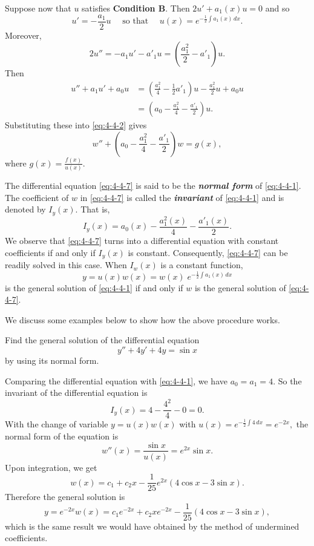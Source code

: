 Suppose now that \(u\) satisfies \textbf{Condition B}. Then \(2u'+a_1(x)u=0\) and so
\[ u' = -\frac{a_1}{2}u\quad \text{ so that }\quad  u(x) = e^{-\frac{1}{2}\int a_1(x) \,dx}.\]
 Moreover, 
 \begin{equation}\label{eq:4-4-6}
 	2u''= - a_1 u' - a'_1 u =\left(\frac{a_1^2}{2}-a'_1\right)u.
\end{equation}
Then 
\[\begin{split}
	u''+a_1 u'+a_0 u &=\left(\frac{a_1^2}{4}-\frac{1}{2}a'_1\right)u - \frac{a_1^2}{2}u +a_0u\\
	&=\left(a_0-\frac{a_1^2}{4}-\frac{a'_1}{2}\right)u.
\end{split} \]
Substituting these into \eqref{eq:4-4-2} gives
\begin{equation}\label{eq:4-4-7}
w''+\left(a_0-\frac{a_1^2}{4}-\frac{a'_1}{2}\right)w = g(x), 
\end{equation}
where \(g(x) = \frac{f(x)}{u(x)}.\)

The differential equation \eqref{eq:4-4-7} is said to be the \textbf{\textit{normal form}} of \eqref{eq:4-4-1}.
The coefficient of \(w\) in \eqref{eq:4-4-7} is called the \textbf{\textit{invariant}} of \eqref{eq:4-4-1} and is denoted by \(I_y(x).\) That is,
\begin{equation}
	I_y(x) = a_0(x)-\frac{a_1^2(x)}{4}-\frac{a'_1(x)}{2}.
	\end{equation} 
 We observe that \eqref{eq:4-4-7} turns into a differential equation with constant coefficients if and only if $I_y(x)$ is constant. Consequently, \eqref{eq:4-4-7} can be readily solved  in this case. When $I_w(x)$  is a constant function,  \[y = u(x) w(x)= w(x)\;e^{-\frac{1}{2}\int a_1(x)\, dx} \] is the general solution of \eqref{eq:4-4-1} if and only if \(w\) is the general solution of \eqref{eq:4-4-7}. 

We discuss some examples below to show how the above procedure works.

\begin{example}
	Find the general solution of the differential equation
 \[y''+4y'+4y = \sin x\]   by using its normal form.
\end{example}
\begin{solution} Comparing the differential  equation with \eqref{eq:4-4-1}, we have $a_0= a_1=4.$
	So the invariant of the differential equation is
	\[I_y(x) = 4-\frac{4^2}{4}-0 = 0.\]
	With the change of variable $y = u(x) w(x)$ with $u(x) = e^{-\frac{1}{2}\int 4\,dx} = e^{-2x},$ the normal form of the equation is
	 \[w''(x) = \frac{\sin x}{u(x)}=  e^{2x}\sin x.\] Upon integration, we get
	 \[w(x) = c_1+c_2 x-\frac{1}{25} e^{2 x} (4 \cos x-3 \sin x).
	 \]
	 Therefore the general solution  is
	 \[y = e^{-2x}w(x) = c_1e^{-2x}+c_2 x e^{-2x}-\frac{1}{25} (4 \cos x-3 \sin x),\]
	 which is the same result we would have  obtained by  the method of undermined coefficients.
\end{solution}


